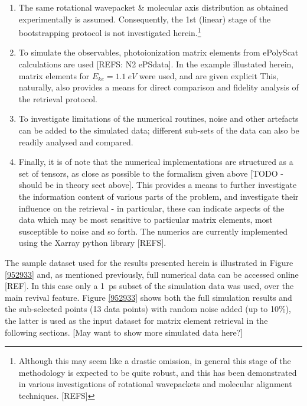 \begin{enumerate}
\item The same rotational wavepacket \& molecular axis distribution as obtained experimentally is assumed. Consequently, the 1st (linear) stage of the bootstrapping protocol is not investigated herein.\footnote{Although this may seem like a drastic omission, in general this stage of the methodology is expected to be quite robust, and this has been demonstrated in various investigations of rotational wavepackets and molecular alignment techniques. [REFS]}
\item To simulate the observables, photoionization matrix elements from ePolyScat \cite{Gianturco1994,Natalense1999} calculations are used [REFS: N2 ePSdata]. In the example illustated herein, matrix elements for $E_{ke}=1.1~eV$ were used, and are given explicit This, naturally, also provides a means for direct comparison and fidelity analysis of the retrieval protocol.
\item To investigate limitations of the numerical routines, noise and other artefacts can be added to the simulated data; different sub-sets of the data can also be readily analysed and compared.
\item Finally, it is of note that the numerical implementations are structured as a set of tensors, as close as possible to the formalism given above [TODO - should be in theory sect above]. This provides a means to further investigate the information content of various parts of the problem, and investigate their influence on the retrieval - in particular, these can indicate aspects of the data which may be most sensitive to particular matrix elements, most susceptible to noise and so forth. The numerics are currently implemented using the Xarray python library [REFS].
\end{enumerate}

The sample dataset used for the results presented herein is illustrated in Figure \ref{952933} and, as mentioned previously, full numerical data can be accessed online [REF]. In this case only a 1~ps subset of the simulation data was used, over the main revival feature. Figure \ref{952933} shows both the full simulation results and the sub-selected points (13 data points) with random noise added (up to 10\%), the latter is used as the input dataset for matrix element retrieval in the following sections. [May want to show more simulated data here?]


